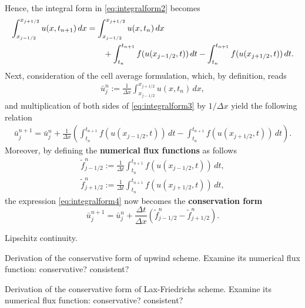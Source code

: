 \documentclass[12pt]{article}
\begin{document}
Hence, the integral form in \eqref{eq:integralform2} becomes
\begin{align}\label{eq:integralform3}
	\int_{x_{j-1/2}}^{x_{j+1/2}} u(x,t_{n+1})\,dx & = 
	\int_{x_{j-1/2}}^{x_{j+1/2}} u(x,t_{n})\,dx \notag                                                     \\
	                                              & \qquad + \int_{t_{n}}^{t_{n+1}} f(u(x_{j-1/2},t)) \,dt
	- \int_{t_{n}}^{t_{n+1}} f(u(x_{j+1/2},t)) \,dt.
\end{align}
Next, consideration of the cell average formulation, which,
by definition, reads
\begin{align}
	\bar{u}_{j}^{n}	:= 
	\frac{1}{\Delta x} \int_{x_{j-1/2}}^{x_{j+1/2}} u(x,t_{n})\,dx,
\end{align}
and multiplication of both sides of \eqref{eq:integralform3} by $1/\Delta x$
yield the following relation
\begin{align}\label{eq:integralform4}
	\bar{u}_{j}^{n+1} = \bar{u}_{j}^{n}
	+ \frac{1}{\Delta x}
	\left(
	\int_{t_{n}}^{t_{n+1}} f(u(x_{j-1/2},t)) \,dt
	- \int_{t_{n}}^{t_{n+1}} f(u(x_{j+1/2},t)) \,dt
	\right).
\end{align}
Moreover, by defining the \textbf{numerical flux functions} as follows
\begin{align}
	\tilde{f}_{j-1/2}^{n} := \frac{1}{\Delta t}\int_{t_{n}}^{t_{n+1}} f(u(x_{j-1/2},t)) \,dt, \\
	\tilde{f}_{j+1/2}^{n} := \frac{1}{\Delta t}\int_{t_{n}}^{t_{n+1}} f(u(x_{j+1/2},t)) \,dt,
\end{align}
the expression \eqref{eq:integralform4} now becomes the \textbf{conservation form}
\begin{equation}
	\boxed{
		\bar{u}_{j}^{n+1} = \bar{u}_{j}^{n}
		+ \frac{\Delta t}{\Delta x}
		\left(
		\tilde{f}_{j-1/2}^{n}
		-\tilde{f}_{j+1/2}^{n}
		\right).
	}
\end{equation}
\begin{example}
	Lipschitz continuity.
\end{example}

\begin{example}
	Derivation of the conservative form of upwind scheme.
	Examine its numerical flux function: conservative? consistent?
\end{example}

\begin{example}
	Derivation of the conservative form of Lax-Friedrichs scheme. 
	Examine its numerical flux function: conservative? consistent?
\end{example}
\end{document}
